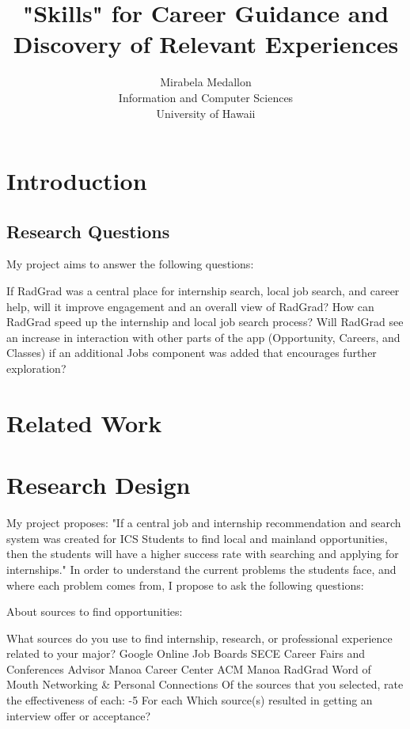 \documentclass[english]{proposalnsf}
\title{"Skills" for Career Guidance and Discovery of Relevant Experiences}
\author{Mirabela Medallon \\ Information and Computer Sciences \\ University of Hawaii}
\begin{document}
	\maketitle
	\tableofcontents
	\newpage
	
	\section{Introduction}
	\label{introduction}


	\subsection{Research Questions}
	\label{questions}

My project aims to answer the following questions: 
\begin{outline}
    \1 If RadGrad was a central place for internship search, local job search, and career help, will it improve engagement and an overall view of RadGrad?
    \1 How can RadGrad speed up the internship and local job search process?
    \1 Will RadGrad see an increase in interaction with other parts of the app (Opportunity, Careers, and Classes) if an additional Jobs component was added that encourages further exploration?
\end{outline}

	\section{Related Work}
	\label{relatedwork}


	\section{Research Design}
	\label{design}
	My project proposes: "If a central job and internship recommendation and search system was created for ICS Students to find local and mainland opportunities, then the students will have a higher success rate with searching and applying for internships." In order to understand the current problems the students face, and where each problem comes from, I propose to ask the following questions:
	
	About sources to find opportunities:
\begin{outline}
    \1 What sources do you use to find internship, research, or professional experience related to your major? 
        \2[\Square] Google
        \2[\Square] Online Job Boards
        \2[\Square] SECE
        \2[\Square] Career Fairs and Conferences
        \2[\Square] Advisor
        \2[\Square] Manoa Career Center
        \2[\Square] ACM Manoa
        \2[\Square] RadGrad
        \2[\Square] Word of Mouth
        \2[\Square] Networking & Personal Connections
    \1 Of the sources that you selected, rate the effectiveness of each:
        -5 For each
    \1 Which source(s) resulted in getting an interview offer or acceptance?
\end{outline}
\end{document}
